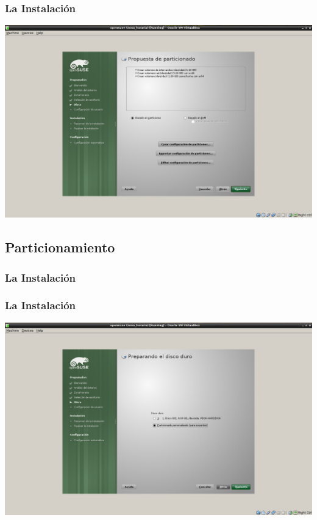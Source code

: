 \documentclass{beamer}
\begin{document}
\begin{frame}
\frametitle{La Instalaci\'on}
\includegraphics[height=0.8\textheight]{5_.png} \hspace*{7.3cm}
\end{frame} 
\subsection{Particionamiento}
\begin{frame}
\frametitle{La Instalaci\'on}
\tableofcontents[currentsubsection]
\end{frame} 

\begin{frame}
\frametitle{La Instalaci\'on}
\includegraphics[height=0.8\textheight]{6.png} \hspace*{7.3cm}
\end{frame} 
\end{document}
